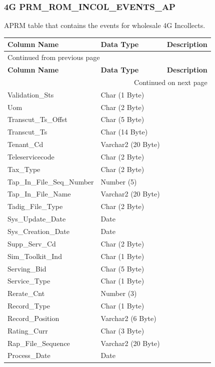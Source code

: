 \documentclass[12pt,twoside]{article}
\begin{document}
\subsubsection{4G PRM\_ROM\_INCOL\_EVENTS\_AP}
\label{sec:orgheadline75}
APRM table that contains the events for wholesale 4G Incollects.
\footnotesize

\begin{longtable}{l|l|l}
\hline
\textbf{Column Name} & \textbf{Data Type} & \textbf{Description}\\
\hline
\endfirsthead
\multicolumn{3}{l}{Continued from previous page} \\
\hline

\textbf{Column Name} & \textbf{Data Type} & \textbf{Description} \\

\hline
\endhead
\hline\multicolumn{3}{r}{Continued on next page} \\
\endfoot
\endlastfoot
\hline
Validation\_Sts & Char (1 Byte) & \\
Uom & Char (2 Byte) & \\
Transcut\_Ts\_Offst & Char (5 Byte) & \\
Transcut\_Ts & Char (14 Byte) & \\
Tenant\_Cd & Varchar2 (20 Byte) & \\
Teleservicecode & Char (2 Byte) & \\
Tax\_Type & Char (2 Byte) & \\
Tap\_In\_File\_Seq\_Number & Number (5) & \\
Tap\_In\_File\_Name & Varchar2 (20 Byte) & \\
Tadig\_File\_Type & Char (2 Byte) & \\
Sys\_Update\_Date & Date & \\
Sys\_Creation\_Date & Date & \\
Supp\_Serv\_Cd & Char (2 Byte) & \\
Sim\_Toolkit\_Ind & Char (1 Byte) & \\
Serving\_Bid & Char (5 Byte) & \\
Service\_Type & Char (1 Byte) & \\
Rerate\_Cnt & Number (3) & \\
Record\_Type & Char (1 Byte) & \\
Record\_Position & Varchar2 (6 Byte) & \\
Rating\_Curr & Char (3 Byte) & \\
Rap\_File\_Sequence & Varchar2 (20 Byte) & \\
Process\_Date & Date & \\

\end{longtable}
\end{document}
